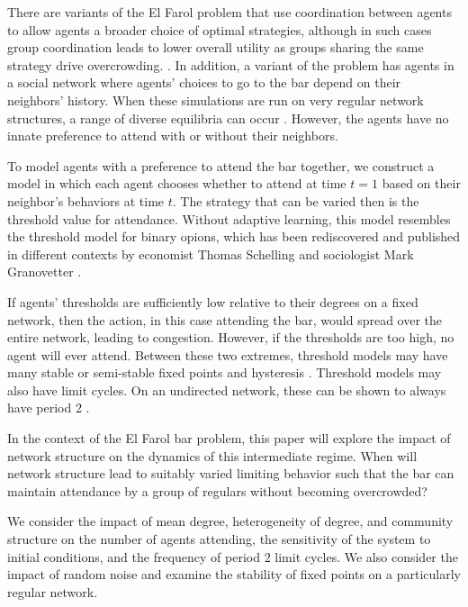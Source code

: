 \documentclass[12pt]{article}
\begin{document}
There are variants of the El Farol problem that use coordination between agents to allow agents a broader choice of optimal strategies, although in such cases group coordination leads to lower overall utility as groups sharing the same strategy drive overcrowding. \cite{collins:2017} \cite{wilensky:2015}.  In addition, a variant of the problem has agents in a social network where agents' choices to go to the bar depend on their neighbors' history.   When these simulations are run on very regular network structures, a range of diverse equilibria can occur \cite{chen:2012}.  However, the agents have no innate preference to attend with or without their neighbors.

To model agents with a preference to attend the bar together, we construct a model in which each agent chooses whether to attend at time $t = 1$ based on their neighbor's behaviors at time $t$.  The strategy that can be varied then is the threshold value for attendance.  Without adaptive learning, this model resembles the threshold model for binary opions, which has been rediscovered and published in different contexts by economist Thomas Schelling \cite{schelling:1978} and sociologist Mark Granovetter \cite{granovetter:1978} \cite{grabish:2020}.  

If agents' thresholds are sufficiently low relative to their degrees on a fixed network, then the action, in this case attending the bar, would spread over the entire network, leading to congestion.  However, if the thresholds are too high, no agent will ever attend.  Between these two extremes, threshold models may have many stable or semi-stable fixed points \cite{adam:2012} and hysteresis \cite{Wiedermann_2020}.  Threshold models may also have limit cycles.  On an undirected network, these can be shown to always have period 2 \cite{grabish:2020} \cite{goles:1980}.

In the context of the El Farol bar problem, this paper will explore the impact of network structure on the dynamics of this intermediate regime.  When will network structure lead to suitably varied limiting behavior such that the bar can maintain attendance by a group of regulars without becoming overcrowded?  

We consider the impact of mean degree, heterogeneity of degree, and community structure on the number of agents attending, the sensitivity of the system to initial conditions, and the frequency of period 2 limit cycles.  We also consider the impact of random noise and examine the stability of fixed points on a particularly regular network.
\end{document}
